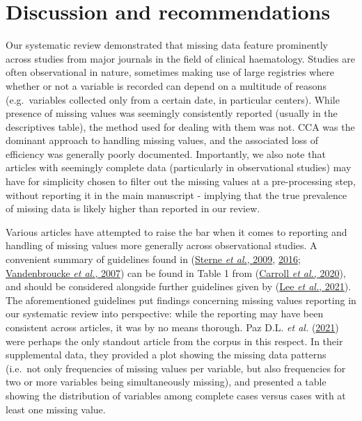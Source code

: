 \documentclass[
  letterpaper,
  DIV=11,
  numbers=noendperiod]{scrreprt}
\begin{document}
\hypertarget{discussion-and-recommendations}{%
\section{Discussion and
recommendations}\label{discussion-and-recommendations}}

Our systematic review demonstrated that missing data feature prominently
across studies from major journals in the field of clinical haematology.
Studies are often observational in nature, sometimes making use of large
registries where whether or not a variable is recorded can depend on a
multitude of reasons (e.g.~variables collected only from a certain date,
in particular centers). While presence of missing values was seemingly
consistently reported (usually in the descriptives table), the method
used for dealing with them was not. CCA was the dominant approach to
handling missing values, and the associated loss of efficiency was
generally poorly documented. Importantly, we also note that articles
with seemingly complete data (particularly in observational studies) may
have for simplicity chosen to filter out the missing values at a
pre-processing step, without reporting it in the main manuscript -
implying that the true prevalence of missing data is likely higher than
reported in our review.

Various articles have attempted to raise the bar when it comes to
reporting and handling of missing values more generally across
observational studies. A convenient summary of guidelines found in
(\protect\hyperlink{ref-sterneMultipleImputationMissing2009}{Sterne
\emph{et al.}, 2009},
\protect\hyperlink{ref-sterneROBINSIToolAssessing2016}{2016};
\protect\hyperlink{ref-vandenbrouckeStrengtheningReportingObservational2007}{Vandenbroucke
\emph{et al.}, 2007}) can be found in Table 1 from
(\protect\hyperlink{ref-carrollHowAreMissing2020}{Carroll \emph{et al.},
2020}), and should be considered alongside further guidelines given by
(\protect\hyperlink{ref-leeFrameworkTreatmentReporting2021}{Lee \emph{et
al.}, 2021}). The aforementioned guidelines put findings concerning
missing values reporting in our systematic review into perspective:
while the reporting may have been consistent across articles, it was by
no means thorough. Paz D.L. \emph{et al.}
(\protect\hyperlink{ref-pazd.l.GenomicAnalysisPrimary2021}{2021}) were
perhaps the only standout article from the corpus in this respect. In
their supplemental data, they provided a plot showing the missing data
patterns (i.e.~not only frequencies of missing values per variable, but
also frequencies for two or more variables being simultaneously
missing), and presented a table showing the distribution of variables
among complete cases versus cases with at least one missing value.
\end{document}
